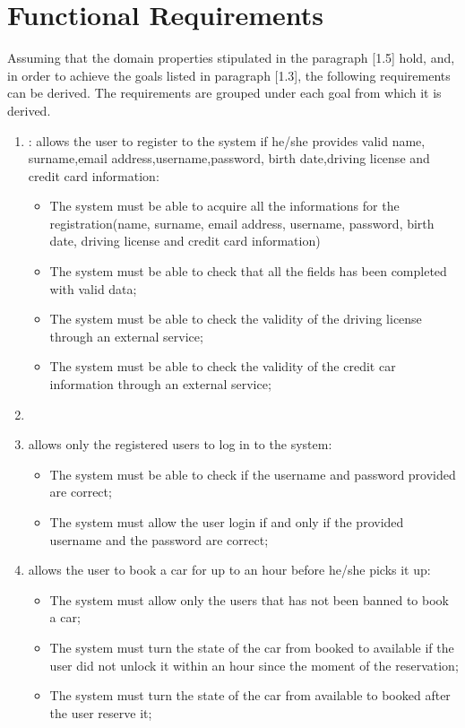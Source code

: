\section{Functional Requirements}
Assuming that the domain properties stipulated in the paragraph [1.5] hold, and, in order to achieve the goals listed in paragraph [1.3], the following requirements can be derived. The requirements are grouped under each goal from which it is derived.

\begin{enumerate}

\item: allows the user to register to the system if he/she provides valid name, surname,email address,username,password, birth date,driving license and credit card information:

\begin{itemize}
	\item The system must be able to acquire all the informations for the registration(name, surname, email address, username, password, birth date, driving license and credit card information)
	\item The system must be able to check that all the fields has been completed with valid data;
	\item The system must be able to check the validity of the driving license through an external service;
	\item The system must be able to check the validity of the credit car information through an external service;
\end{itemize}

\item \item allows only the registered users to log in to the system:

\begin{itemize}
	\item The system must be able to check if the username and password provided are correct;
	\item The system must allow the user login if and only if the provided username and the password are correct;
\end{itemize}

\item allows the user to book a car for up to an hour before he/she picks it up:

\begin{itemize}
	\item The system must allow only the users that has not been banned to book a car;
	\item The system must turn the state of the car from booked to available if the user did not unlock it within an hour since the moment of the reservation;
	\item The system must turn the state of the car from available to booked after the user reserve it;
\end{itemize}


\end{enumerate}
